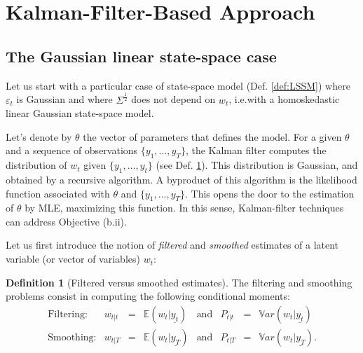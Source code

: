 \documentclass[
  12pt,
]{book}
\theoremstyle{definition}
\newtheorem{definition}{Definition}[chapter]
\theoremstyle{definition}
\theoremstyle{definition}
\theoremstyle{definition}
\theoremstyle{remark}
\begin{document}
\hypertarget{Estimation:KF}{%
\section{Kalman-Filter-Based Approach}\label{Estimation:KF}}

\hypertarget{the-gaussian-linear-state-space-case}{%
\subsection{The Gaussian linear state-space case}\label{the-gaussian-linear-state-space-case}}

Let us start with a particular case of state-space model (Def. \ref{def:LSSM}) where \(\varepsilon_t\) is Gaussian and where \(\Sigma^{\frac{1}{2}}\) does not depend on \(w_t\), i.e.with a homoskedastic linear Gaussian state-space model.

Let's denote by \(\theta\) the vector of parameters that defines the model. For a given \(\theta\) and a sequence of observations \(\{y_1,\dots,y_T\}\), the Kalman filter computes the distribution of \(w_t\) given \(\{y_1,\dots,y_t\}\) (see Def. \ref{def:FiltvsSmooth}). This distribution is Gaussian, and obtained by a recursive algorithm. A byproduct of this algorithm is the likelihood function associated with \(\theta\) and \(\{y_1,\dots,y_T\}\). This opens the door to the estimation of \(\theta\) by MLE, maximizing this function. In this sense, Kalman-filter techniques can address Objective (b.ii).

Let us first introduce the notion of \emph{filtered} and \emph{smoothed} estimates of a latent variable (or vector of variables) \(w_t\):

\begin{definition}[Filtered versus smoothed estimates]
\protect\hypertarget{def:FiltvsSmooth}{}\label{def:FiltvsSmooth}The filtering and smoothing problems consist in computing the following conditional moments:
\begin{equation*}
\begin{array}{lccllllll}
\mbox{Filtering:} & w_{t|t} & = & \mathbb{E}(w_t|\underline{y_t}) & \mbox{and}  & P_{t|t} &=& \mathbb{V}ar(w_t|\underline{y_t})\\
\mbox{Smoothing:} & w_{t|T} & = & \mathbb{E}(w_t|\underline{y_T}) & \mbox{and} & P_{t|T} &=& \mathbb{V}ar(w_t|\underline{y_T}).
\end{array}
\end{equation*}
\end{definition}
\end{document}
